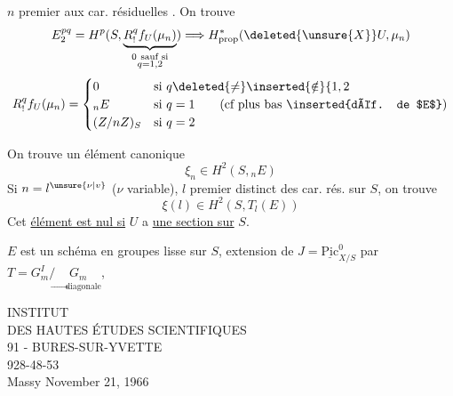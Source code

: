 $n$ premier aux car. résiduelles . On trouve
\[
E^{pq}_{2}=H^p(S,\underbrace{R^q_{!}f_U(\mu_n)}_{\substack{0\ \text{sauf si}\\q=1,2}})\Longrightarrow H^{*}_{\mathrm{prop}}(\deleted{\unsure{X}}U,\mu_n)
\]
\[
R^q_{!}f_U(\mu_n)=
\begin{cases}
0 & \text{si }q\deleted{\ne}\inserted{\notin}\{1,2\\
{}_{n}E & \text{si }q=1\qquad\text{(cf plus bas \inserted{déf. de $E$})}\\
(Z/nZ)_S & \text{si }q=2
\end{cases}
\]

On trouve un élément canonique
\[
\xi_n\in H^2(S,{}_{n}E)
\]
Si $n=l^{\unsure{\nu|v}}$ ($\nu$ variable), $l$ premier distinct des car. rés. sur $S$, on trouve
\[
\boxed{\xi(l)\in H^2(S,T_l(E))}
\]
Cet \uline{élément est nul si} $U$ a \uline{une section sur} $S$.

$E$ est un schéma en groupes lisse sur $S$,   extension de $J=\underline{\mathrm{Pic}}^{0}_{X/S}$ par $T=G_m^{I}/\underset{\longrightarrow\,\text{diagonale}}{G_m}$,

INSTITUT\\
DES HAUTES ÉTUDES SCIENTIFIQUES\\
91 - BURES-SUR-YVETTE\\
928-48-53\\

Massy November 21, 1966\\

